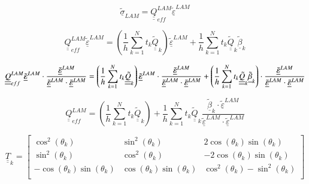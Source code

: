 \documentclass[review]{elsarticle}
\begin{document}
\begin{equation}
\underline{\tilde{\sigma}}_{LAM}=\underline{\underline{Q}}_{eff}^{LAM}\underline{\tilde{\varepsilon}}^{LAM}
\end{equation}

\begin{equation}
\underline{\underline{Q}}_{eff}^{LAM}\underline{\tilde{\varepsilon}}^{LAM}=\left(\frac{1}{h}\sum_{k=1}^{N}t_{k}\underline{\underline{\tilde{Q}}}_{k}\right)\underline{\tilde{\varepsilon}}^{LAM}+\frac{1}{h}\sum_{k=1}^{N}t_{k}\underline{\underline{\tilde{Q}}}_{k}\underline{\tilde{\beta}}_{k}
\end{equation}

\begin{equation}
\footnotesize
\underline{\underline{Q}}_{eff}^{LAM}\underline{\tilde{\varepsilon}}^{LAM}\cdot\frac{\underline{\tilde{\varepsilon}}^{LAM}}{\underline{\tilde{\varepsilon}}^{LAM}\cdot\underline{\tilde{\varepsilon}}^{LAM}}=\left(\frac{1}{h}\sum_{k=1}^{N}t_{k}\underline{\underline{\tilde{Q}}}_{k}\right)\underline{\tilde{\varepsilon}}^{LAM}\cdot\frac{\underline{\tilde{\varepsilon}}^{LAM}}{\underline{\tilde{\varepsilon}}^{LAM}\cdot\underline{\tilde{\varepsilon}}^{LAM}}+\left(\frac{1}{h}\sum_{k=1}^{N}t_{k}\underline{\underline{\tilde{Q}}}_{k}\underline{\tilde{\beta}}_{k}\right)\cdot\frac{\underline{\tilde{\varepsilon}}^{LAM}}{\underline{\tilde{\varepsilon}}^{LAM}\cdot\underline{\tilde{\varepsilon}}^{LAM}}
\end{equation}

\begin{equation}
\underline{\underline{Q}}_{eff}^{LAM}=\left(\frac{1}{h}\sum_{k=1}^{N}t_{k}\underline{\underline{\tilde{Q}}}_{k}\right)+\frac{1}{h}\sum_{k=1}^{N}t_{k}\underline{\underline{\tilde{Q}}}_{k}\frac{\underline{\tilde{\beta}}_{k}\cdot\underline{\tilde{\varepsilon}}^{LAM}}{\underline{\tilde{\varepsilon}}^{LAM}\cdot\underline{\tilde{\varepsilon}}^{LAM}}
\end{equation}

\begin{equation}
\underline{\underline{T}}_{k}=\begin{bmatrix}
\cos^{2}\left(\theta_{k}\right)&\sin^{2}\left(\theta_{k}\right)&2\cos\left(\theta_{k}\right)\sin\left(\theta_{k}\right)\\
\sin^{2}\left(\theta_{k}\right)&\cos^{2}\left(\theta_{k}\right)&-2\cos\left(\theta_{k}\right)\sin\left(\theta_{k}\right)\\
-\cos\left(\theta_{k}\right)\sin\left(\theta_{k}\right)&\cos\left(\theta_{k}\right)\sin\left(\theta_{k}\right)&\cos^{2}\left(\theta_{k}\right)-\sin^{2}\left(\theta_{k}\right)\\
\end{bmatrix}
\end{equation}
\end{document}
